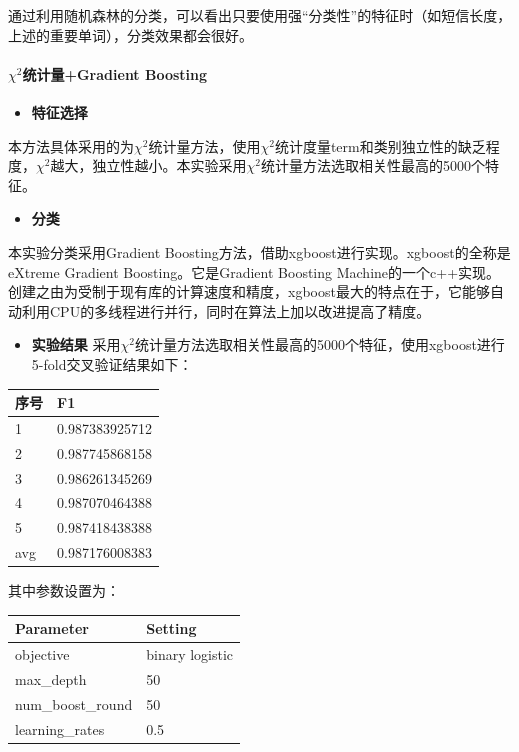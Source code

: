 \documentclass{article}
\begin{document}
通过利用随机森林的分类，可以看出只要使用强``分类性''的特征时（如短信长度，上述的重要单词），分类效果都会很好。

\paragraph{\texorpdfstring{\(\chi^2\)统计量+Gradient
Boosting}{\textbackslash{}chi\^{}2统计量+Gradient Boosting}}\label{chi2ux7edfux8ba1ux91cfgradient-boosting}

\begin{itemize}
\tightlist
\item
  \textbf{特征选择}
\end{itemize}

本方法具体采用的为\(\chi^2\)统计量方法，使用\(\chi^2\)统计度量term和类别独立性的缺乏程度，\(\chi^2\)越大，独立性越小。本实验采用\(\chi^2\)统计量方法选取相关性最高的5000个特征。

\begin{itemize}
\tightlist
\item
  \textbf{分类}
\end{itemize}

本实验分类采用Gradient
Boosting方法，借助xgboost进行实现。xgboost的全称是eXtreme Gradient
Boosting。它是Gradient Boosting
Machine的一个c++实现。创建之由为受制于现有库的计算速度和精度，xgboost最大的特点在于，它能够自动利用CPU的多线程进行并行，同时在算法上加以改进提高了精度。

\begin{itemize}
\tightlist
\item
  \textbf{实验结果}
  采用\(\chi^2\)统计量方法选取相关性最高的5000个特征，使用xgboost进行5-fold交叉验证结果如下：
\end{itemize}

\begin{longtable}[]{@{}ll@{}}
\toprule
序号 & F1\tabularnewline
\midrule
\endhead
1 & 0.987383925712\tabularnewline
2 & 0.987745868158\tabularnewline
3 & 0.986261345269\tabularnewline
4 & 0.987070464388\tabularnewline
5 & 0.987418438388\tabularnewline
avg & 0.987176008383\tabularnewline
\bottomrule
\end{longtable}

其中参数设置为：

\begin{longtable}[]{@{}ll@{}}
\toprule
Parameter & Setting\tabularnewline
\midrule
\endhead
objective & binary logistic\tabularnewline
max\_depth & 50\tabularnewline
num\_boost\_round & 50\tabularnewline
learning\_rates & 0.5\tabularnewline
\bottomrule
\end{longtable}
\end{document}
